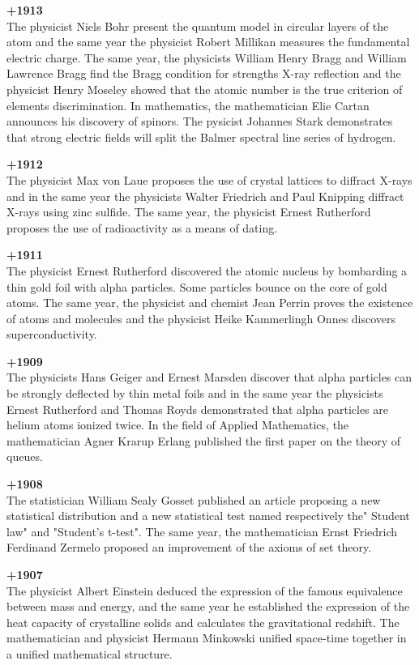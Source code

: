 \textbf{+1913}\\
The physicist Niels Bohr present the quantum model in circular layers of the atom and the same year the physicist Robert Millikan measures the fundamental electric charge. The same year, the physicists William Henry Bragg and William Lawrence Bragg find the Bragg condition for strengths X-ray reflection and the physicist Henry Moseley showed that the atomic number is the true criterion of elements discrimination. In mathematics, the mathematician Elie Cartan announces his discovery of spinors. The pysicist Johannes Stark demonstrates that strong electric fields will split the Balmer spectral line series of hydrogen.

\textbf{+1912}\\
The physicist Max von Laue proposes the use of crystal lattices to diffract X-rays and in the same year the physicists Walter Friedrich and Paul Knipping diffract X-rays using zinc sulfide. The same year, the physicist Ernest Rutherford proposes the use of radioactivity as a means of dating. 

\pagebreak
\textbf{+1911}\\
The physicist Ernest Rutherford discovered the atomic nucleus by bombarding a thin gold foil with alpha particles. Some particles bounce on the core of gold atoms. The same year, the physicist and chemist Jean Perrin proves the existence of atoms and molecules and the physicist Heike Kammerlingh Onnes discovers superconductivity.

\textbf{+1909}\\
The physicists Hans Geiger and Ernest Marsden discover that alpha particles can be strongly deflected by thin metal foils and in the same year the physicists Ernest Rutherford and Thomas Royds demonstrated that alpha particles are helium atoms ionized twice. In the field of Applied Mathematics, the mathematician Agner Krarup Erlang published the first paper on the theory of queues. 

\textbf{+1908}\\
The statistician William Sealy Gosset published an article proposing a new statistical distribution and a new statistical test named respectively the" Student law" and "Student's t-test". The same year, the mathematician Ernst Friedrich Ferdinand Zermelo proposed an improvement of the axioms of set theory.

\textbf{+1907}\\
The physicist Albert Einstein deduced the expression of the famous equivalence between mass and energy, and the same year he established the expression of the heat capacity of crystalline solids and calculates the gravitational redshift. The mathematician and physicist Hermann Minkowski unified space-time together in a unified mathematical structure.

